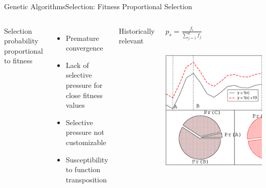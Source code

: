 \documentclass[10pt,compress]{beamer} %
\begin{document}
\begin{frame}{Genetic Algorithms}{Selection: Fitness Proportional Selection}
    \begin{columns}
	Selection probability proportional to fitness 
	\begin{itemize}
		\item Premature convergence
		\item Lack of selective pressure for close fitness values
		\item Selective pressure not customizable
		\item Susceptibility to function transposition
  	\end{itemize}
	Historically relevant
	\begin{center}
    \begin{columns}
	\begin{block}{}
	$p_s = \frac{f_i}{\sum_{j=1}^\mu f_j}$
	\end{block}
	\end{columns}
	\bigskip
	\includegraphics[width=\linewidth]{figs/fps.eps}
	\end{center}
	\end{columns}
\end{frame}
\end{document}
